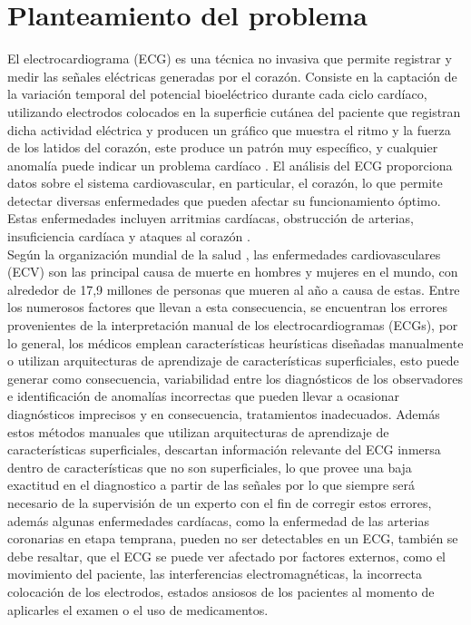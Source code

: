 \documentclass[12pt,letterpaper,oneside,openright]{book}
\begin{document}
\chapter{Planteamiento del problema}
	El electrocardiograma (ECG) es una técnica no invasiva que permite registrar y medir las señales eléctricas generadas por el corazón. Consiste en la captación de la variación temporal del potencial bioeléctrico durante cada ciclo cardíaco, utilizando electrodos colocados en la superficie cutánea del paciente que registran dicha actividad eléctrica y producen un gráfico que muestra el ritmo y la fuerza de los latidos del corazón, este produce un patrón muy específico, y cualquier anomalía puede indicar un problema cardíaco \cite{ZHANG2021113}. El análisis del ECG proporciona datos sobre el sistema cardiovascular, en particular, el corazón, lo que permite detectar diversas enfermedades que pueden afectar su funcionamiento óptimo. Estas enfermedades incluyen arritmias cardíacas, obstrucción de arterias, insuficiencia cardíaca y ataques al corazón \cite{MedlineECG}. \\ Según la organización mundial de la salud \cite{Who}, las enfermedades cardiovasculares (ECV) son las principal causa de muerte en hombres y mujeres en el mundo, con alrededor de 17,9 millones de personas que mueren al año a causa de estas. Entre los numerosos factores que llevan a esta consecuencia, se encuentran los errores provenientes de la interpretación manual de los electrocardiogramas (ECGs), por lo general, los médicos emplean características heurísticas diseñadas manualmente o utilizan arquitecturas de aprendizaje de características superficiales, esto puede generar como consecuencia, variabilidad entre los diagnósticos de los observadores e identificación de anomalías incorrectas que pueden llevar a ocasionar diagnósticos imprecisos y en consecuencia, tratamientos inadecuados. Además estos métodos manuales que utilizan arquitecturas de aprendizaje de características superficiales, descartan información relevante del ECG inmersa dentro de características que no son superficiales, lo que provee una baja exactitud en el diagnostico a partir de las señales por lo que siempre será necesario de la supervisión de un experto con el fin de corregir estos errores, además algunas enfermedades cardíacas, como la enfermedad de las arterias coronarias en etapa temprana, pueden no ser detectables en un ECG, también se debe resaltar, que el ECG se puede ver afectado por factores externos, como el movimiento del paciente, las interferencias electromagnéticas, la incorrecta colocación de los electrodos, estados ansiosos de los pacientes al momento de aplicarles el examen o el uso de medicamentos.
\end{document}
